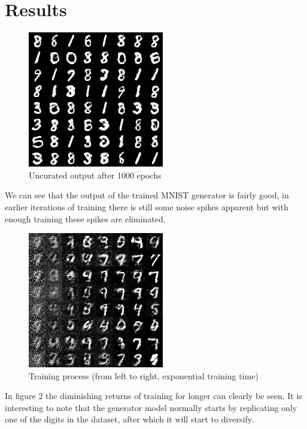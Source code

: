 \section{Results}\label{sec:results}

\begin{figure}[h!]
    \centering
    \includegraphics{media/output}
    \caption{Uncurated output after 1000 epochs}
    \label{fig:mnist_output}
\end{figure}

We can see that the output of the trained MNIST generator is fairly good, in earlier iterations
of training there is still some noise spikes apparent but with enough training these spikes are
eliminated.

\begin{figure}[h!]
    \centering
    \includegraphics{media/training}
    \caption{Training process (from left to right, exponential training time)}
    \label{fig:mnist_training}
\end{figure}

In figure 2 the diminishing returns of training for longer can clearly be seen.
It is interesting to note that the generator model normally starts by replicating only one of the
digits in the dataset, after which it will start to diversify.

